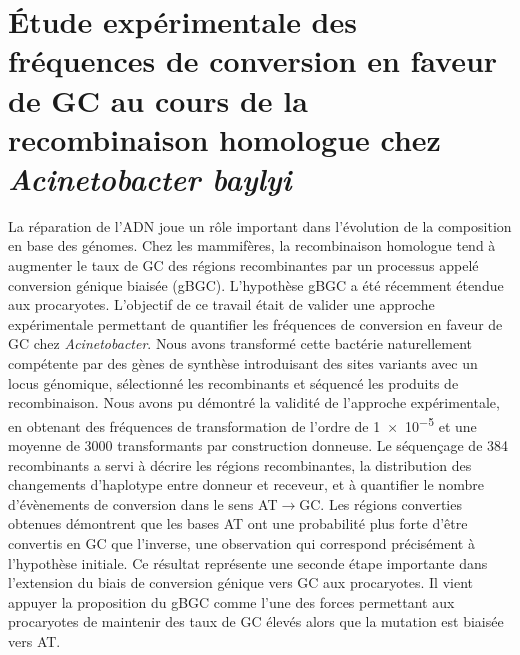 \null
\vfill

\section*{\large \centering Étude expérimentale des fréquences de conversion en faveur de GC au
  cours de la recombinaison homologue chez \emph{Acinetobacter baylyi}}
\thispagestyle{empty}

La réparation de l'ADN joue un rôle important dans l'évolution de la composition
en base des génomes. Chez les mammifères, la recombinaison homologue tend à
augmenter le taux de GC des régions recombinantes par un processus appelé
conversion génique biaisée (gBGC). L'hypothèse gBGC a été récemment étendue aux
procaryotes. L'objectif de ce travail était de valider une approche
expérimentale permettant de quantifier les fréquences de conversion en faveur de
GC chez \emph{Acinetobacter}. Nous avons transformé cette bactérie naturellement
compétente par des gènes de synthèse introduisant des sites variants avec un
locus génomique, sélectionné les recombinants et séquencé les produits de
recombinaison. Nous avons pu démontré la validité de l'approche expérimentale,
en obtenant des fréquences de transformation de l'ordre de \num{1e-5} et une
moyenne de \num{3000} transformants par construction donneuse. Le séquençage de
\num{384} recombinants a servi à décrire les régions recombinantes, la
distribution des changements d'haplotype entre donneur et receveur, et à
quantifier le nombre d'évènements de conversion dans le sens AT$\rightarrow$GC.
Les régions converties obtenues démontrent que les bases AT ont une probabilité
plus forte d'être convertis en GC que l'inverse, une observation qui correspond
précisément à l'hypothèse initiale. Ce résultat représente une seconde étape
importante dans l'extension du biais de conversion génique vers GC aux
procaryotes. Il vient appuyer la proposition du gBGC comme l'une des forces
permettant aux procaryotes de maintenir des taux de GC élevés alors que la
mutation est biaisée vers AT.

\vfill